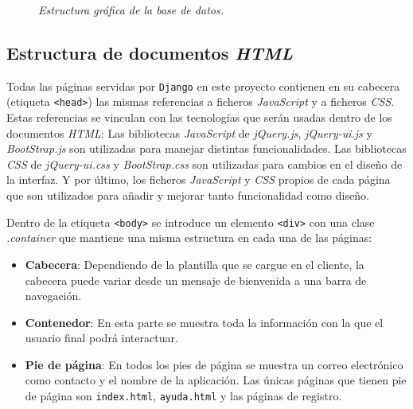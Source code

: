 \documentclass[a4paper, 12pt]{book}
\begin{document}
\begin{figure}
  \centering
  \caption{\textit{Estructura gr\'afica de la base de datos.}}
  \label{fig:disenobbdd}
\end{figure}


\subsection{Estructura de documentos \textit{HTML}} 
\label{sec:estructurahtml}
Todas las p\'aginas servidas por \texttt{Django} en este proyecto contienen en su cabecera (etiqueta \texttt{<head>}) las mismas referencias a ficheros 
\textit{JavaScript} y a ficheros \textit{CSS}. Estas referencias se vinculan con las tecnolog\'ias que ser\'an usadas dentro de los documentos \textit{HTML}:
Las bibliotecas \textit{JavaScript} de \textit{jQuery.js}, \textit{jQuery-ui.js} y \textit{BootStrap.js} son utilizadas para manejar distintas 
funcionalidades. Las bibliotecas \textit{CSS} de \textit{jQuery-ui.css} y \textit{BootStrap.css} son utilizadas para cambios en el dise\~no de la interfaz. 
Y por \'ultimo, los ficheros \textit{JavaScript} y \textit{CSS} propios de cada p\'agina que son utilizados para a\~nadir y mejorar tanto funcionalidad 
como dise\~no.

Dentro de la etiqueta \texttt{<body>} se introduce un elemento \texttt{<div>} con una clase \textit{.container} que mantiene una misma estructura en cada 
una de las p\'aginas:
\begin{itemize}
  \item {\bfseries Cabecera}: Dependiendo de la plantilla que se cargue en el cliente, la cabecera puede variar desde un mensaje de bienvenida a una barra
  de navegaci\'on.
  \item {\bfseries Contenedor}: En esta parte se muestra toda la informaci\'on con la que el usuario final podr\'a interactuar.
  \item {\bfseries Pie de p\'agina}: En todos los pies de p\'agina se muestra un correo electr\'onico como contacto y el nombre de la aplicaci\'on. 
  Las \'unicas p\'aginas que tienen pie de p\'agina son \texttt{index.html}, \texttt{ayuda.html} y las p\'aginas de registro.
\end{itemize}
\end{document}
